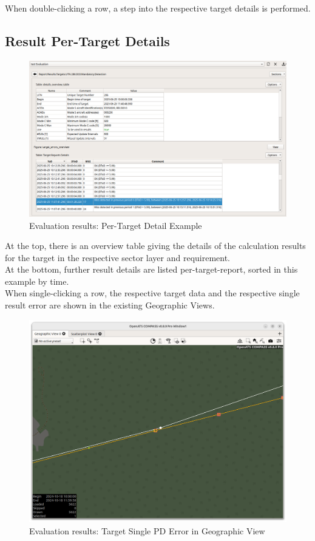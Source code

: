 When double-clicking a row, a step into the respective target details is performed.

\subsection{Result Per-Target Details}

\begin{figure}[H]
  \hspace*{-2cm}
    \includegraphics[width=18cm,frame]{figures/eval_results_target_example.png}
  \caption{Evaluation results: Per-Target Detail Example}
\end{figure}

At the top, there is an overview table giving the details of the calculation results for the target in the respective sector layer and requirement. \\

At the bottom, further result details are listed per-target-report, sorted in this example by time. \\

When single-clicking a row, the respective target data and the respective single result error are shown in the existing Geographic Views.

\begin{figure}[H]
  \hspace*{-2.5cm}
    \includegraphics[width=19cm]{figures/eval_results_pd_single_tr_geoview.png}
  \caption{Evaluation results: Target Single PD Error in Geographic View}
\end{figure}
